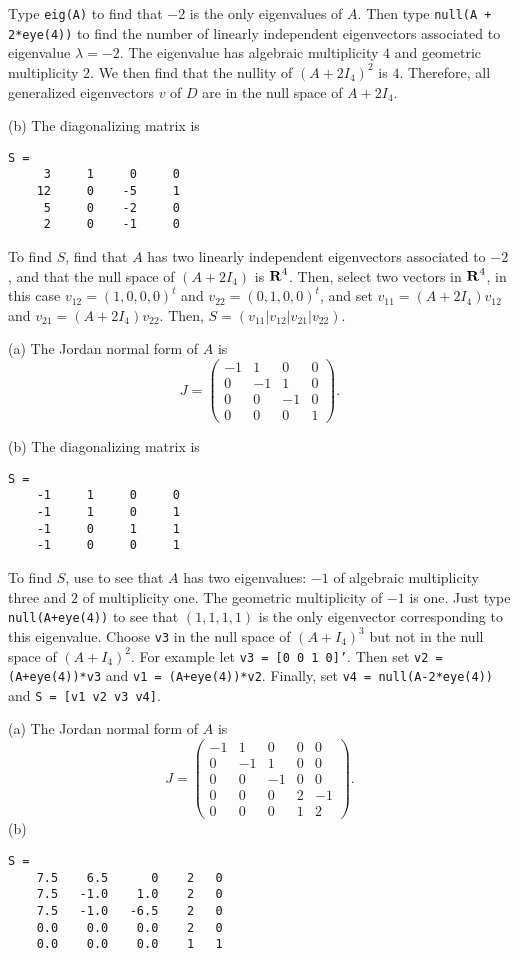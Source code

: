\documentclass{ximera}
\begin{document}
\soln
Type {\tt eig(A)} to find that $-2$ is the only eigenvalues of $A$.  Then 
type {\tt null(A + 2*eye(4))} to find the number of linearly
independent eigenvectors associated to eigenvalue $\lambda = -2$.  
The eigenvalue has algebraic multiplicity $4$ and geometric multiplicity
$2$.  We then find that the nullity of $(A + 2I_4)^2$ is $4$. 
Therefore, all generalized eigenvectors $v$ of $D$ are in the null space
of $A + 2I_4$.

(b) \ans   The diagonalizing matrix is
\begin{verbatim}
S =
     3     1     0     0
    12     0    -5     1
     5     0    -2     0
     2     0    -1     0
\end{verbatim}

\soln To find $S$, find that $A$ has two linearly independent
eigenvectors associated to $-2$, and that the null space
of $(A + 2I_4)$ is $\mbox{$\bf{R}$}^4$.  Then, select two vectors in $\mbox{$\bf{R}$}^4$, in this
case $v_{12} = (1,0,0,0)^t$ and $v_{22} = (0,1,0,0)^t$, and set
$v_{11} = (A + 2I_4)v_{12}$ and $v_{21} = (A + 2I_4)v_{22}$.  Then,
$S = (v_{11}|v_{12}|v_{21}|v_{22})$.

(a) \ans The Jordan normal form of $A$ is
\[
J = \left(\begin{array}{rrrr}
-1 &  1 &  0 & 0 \\
0  & -1 &  1 & 0 \\
0  &  0 & -1 & 0 \\
0  &  0 &  0 & 1 \end{array}\right).
\]

(b) \ans  The diagonalizing matrix is
\begin{verbatim}
S =
    -1     1     0     0
    -1     1     0     1
    -1     0     1     1
    -1     0     0     1
\end{verbatim}

\soln To find $S$, use \Matlab to see that $A$ has two eigenvalues: $-1$ of
algebraic multiplicity three and $2$ of multiplicity one.  The geometric 
multiplicity of $-1$ is one.  Just type {\tt null(A+eye(4))} to see that 
$(1,1,1,1)$ is the only eigenvector corresponding to this eigenvalue.  Choose 
{\tt v3} in the null space of $(A+I_4)^3$ but not in the null space of 
$(A+I_4)^2$.  For example let {\tt v3 = [0 0 1 0]'}.  Then set 
{\tt v2 = (A+eye(4))*v3} and {\tt v1 = (A+eye(4))*v2}.  Finally, set 
{\tt v4 = null(A-2*eye(4))} and {\tt S = [v1 v2 v3 v4]}.

 (a) \ans The Jordan normal form of $A$ is
\[
J = \left(\begin{array}{rrrrr}
-1 &  1 &  0 & 0 &  0 \\
 0 & -1 &  1 & 0 &  0 \\
 0 &  0 & -1 & 0 &  0 \\
 0 &  0 &  0 & 2 & -1 \\
 0 &  0 &  0 & 1 &  2 \end{array}\right).
\]
(b) \ans
\begin{verbatim}
S =
    7.5    6.5      0    2   0
    7.5   -1.0    1.0    2   0
    7.5   -1.0   -6.5    2   0
    0.0    0.0    0.0    2   0
    0.0    0.0    0.0    1   1
\end{verbatim}
\end{document}
